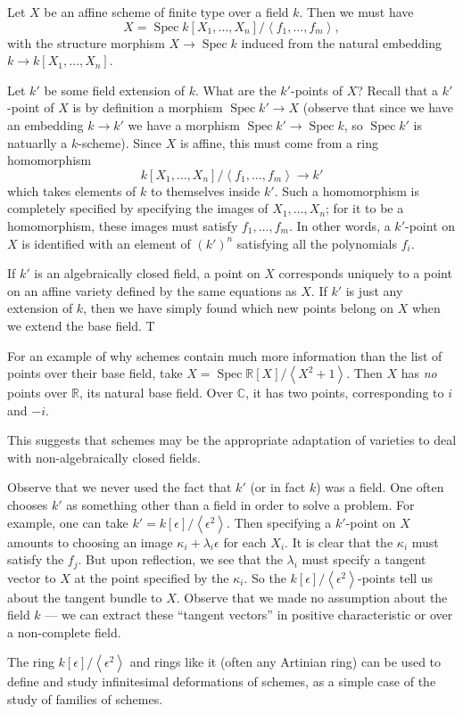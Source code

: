 \documentclass[12pt]{article}
\DeclareMathOperator{\Spec}{Spec}
\begin{document}
Let $X$ be an affine scheme of finite type over a field $k$.  Then we must have
\[
X = \Spec k[X_1,\ldots,X_n]/\left<f_1,\ldots,f_m\right>,
\]
with the structure morphism $X\to\Spec k$ induced from the natural embedding $k\to k[X_1,\ldots,X_n]$. 

Let $k'$ be some field extension of $k$.  What are the $k'$-points of $X$?  Recall that a $k'$-point of $X$ is by definition a morphism $\Spec k' \to X$ (observe that since we have an embedding $k\to k'$ we have a morphism $\Spec k' \to \Spec k$, so $\Spec k'$ is natuarlly a $k$-scheme).  Since $X$ is affine, this must come from a ring homomorphism
\[
k[X_1,\ldots,X_n]/\left<f_1,\ldots,f_m\right> \to k'
\]
which takes elements of $k$ to themselves inside $k'$.  Such a homomorphism is completely specified by specifying the images of $X_1,\ldots,X_n$; for it to be a homomorphism, these images must satisfy $f_1,\ldots,f_m$.  In other words, a $k'$-point on $X$ is identified with an element of $(k')^n$ satisfying all the polynomials $f_i$.  

If $k'$ is an algebraically closed field, a point on $X$ corresponds uniquely to a point on an affine variety defined by the same equations as $X$.  If $k'$ is just any extension of $k$, then we have simply found which new points belong on $X$ when we extend the base field.  T

For an example of why schemes contain much more information than the list of points over their base field, take $X=\Spec \mathbb{R}[X]/\left<X^2+1\right>$.  Then $X$ has \emph{no} points over $\mathbb{R}$, its natural base field.  Over $\mathbb{C}$, it has two points, corresponding to $i$ and $-i$. 

This suggests that schemes may be the appropriate adaptation of varieties to deal with non-algebraically closed fields.

Observe that we never used the fact that $k'$ (or in fact $k$) was a field.  One often chooses $k'$ as something other than a field in order to solve a problem.  For example, one can take $k' = k[\epsilon]/\left<\epsilon^2\right>$.  Then specifying a $k'$-point on $X$ amounts to choosing an image $\kappa_i + \lambda_i\epsilon$ for each $X_i$.  It is clear that the $\kappa_i$ must satisfy the $f_j$.  But upon reflection, we see that the $\lambda_i$ must specify a tangent vector to $X$ at the point specified by the $\kappa_i$.  So the $k[\epsilon]/\left<\epsilon^2\right>$-points tell us about the tangent bundle to $X$.  Observe that we made no assumption about the field $k$ --- we can extract these ``tangent vectors'' in positive characteristic or over a non-complete field.

The ring $k[\epsilon]/\left<\epsilon^2\right>$ and rings like it (often any Artinian ring) can be used to define and study infinitesimal deformations of schemes, as a simple case of the study of families of schemes.
\end{document}
